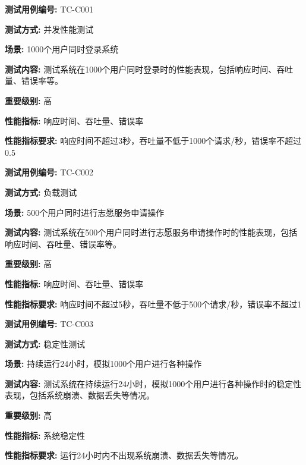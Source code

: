 \begin{framed} \textbf{测试用例编号:} TC-C001

\textbf{测试方式:} 并发性能测试

\textbf{场景:} 1000个用户同时登录系统

\textbf{测试内容:} 测试系统在1000个用户同时登录时的性能表现，包括响应时间、吞吐量、错误率等。

\textbf{重要级别:} 高

\textbf{性能指标:} 响应时间、吞吐量、错误率

\textbf{性能指标要求:} 响应时间不超过3秒，吞吐量不低于1000个请求/秒，错误率不超过0.5%

\begin{center}
\end{center}
\end{framed}

\begin{framed} \textbf{测试用例编号:} TC-C002

\textbf{测试方式:} 负载测试

\textbf{场景:} 500个用户同时进行志愿服务申请操作

\textbf{测试内容:} 测试系统在500个用户同时进行志愿服务申请操作时的性能表现，包括响应时间、吞吐量、错误率等。

\textbf{重要级别:} 高

\textbf{性能指标:} 响应时间、吞吐量、错误率

\textbf{性能指标要求:} 响应时间不超过5秒，吞吐量不低于500个请求/秒，错误率不超过1%

\begin{center}
\end{center}
\end{framed}

\begin{framed} \textbf{测试用例编号:} TC-C003

\textbf{测试方式:} 稳定性测试

\textbf{场景:} 持续运行24小时，模拟1000个用户进行各种操作

\textbf{测试内容:} 测试系统在持续运行24小时，模拟1000个用户进行各种操作时的稳定性表现，包括系统崩溃、数据丢失等情况。

\textbf{重要级别:} 高

\textbf{性能指标:} 系统稳定性

\textbf{性能指标要求:} 运行24小时内不出现系统崩溃、数据丢失等情况。

\begin{center}
\end{center}
\end{framed}

